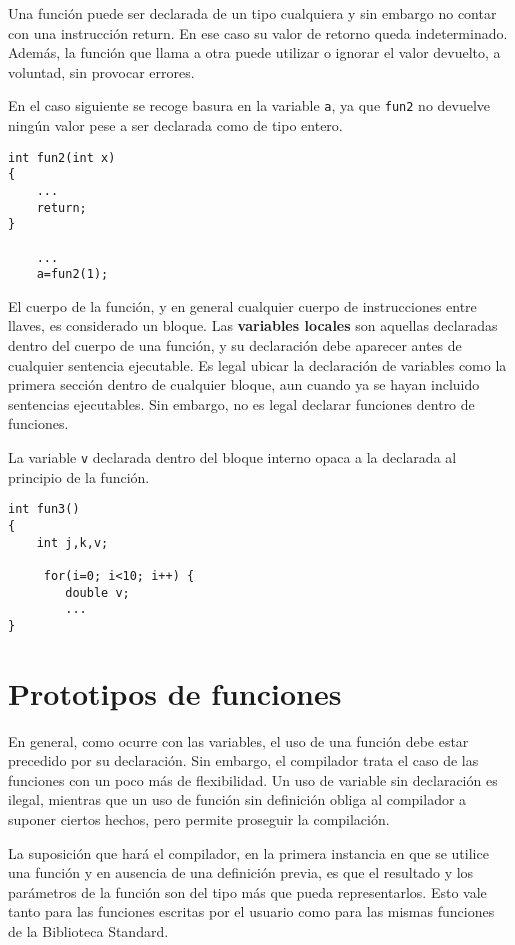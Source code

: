 Una función puede ser declarada de un tipo cualquiera y sin embargo no contar
con una instrucción return. En ese caso su valor de retorno queda
indeterminado. Además, la función que llama a otra puede utilizar o ignorar el
valor devuelto, a voluntad, sin provocar errores.

\begin{ejemplo}
En el caso siguiente se recoge basura en la variable \lstinline{a}, ya que \lstinline{fun2} no devuelve
ningún valor pese a ser declarada como de tipo entero.
\begin{lstlisting}
int fun2(int x)
{
    ...
    return;
}

    ...
    a=fun2(1);
\end{lstlisting}
\end{ejemplo}


El cuerpo de la función, y en general cualquier cuerpo de instrucciones entre
llaves, es considerado un bloque. Las \textbf{variables locales} son aquellas declaradas
dentro del cuerpo de una función, y su declaración debe aparecer antes de
cualquier sentencia ejecutable. Es legal ubicar la declaración de variables
como la primera sección dentro de cualquier bloque, aun cuando ya se hayan
incluido sentencias ejecutables. Sin embargo, no es legal declarar funciones
dentro de funciones. 

\begin{ejemplo}
La variable \lstinline{v} declarada dentro del bloque
interno opaca a la declarada al principio de la función.
\begin{lstlisting}
int fun3()
{
    int j,k,v;

     for(i=0; i<10; i++) {
        double v;
        ...
}
\end{lstlisting}
\end{ejemplo}

	

\section{Prototipos de funciones}
En general, como ocurre con las variables, el uso de una función debe estar
precedido por su declaración. Sin embargo, el compilador trata el caso de las
funciones con un poco más de flexibilidad. Un uso de variable sin declaración
es ilegal, mientras que un uso de función sin definición obliga al compilador a
suponer ciertos hechos, pero permite proseguir la compilación.

La suposición que hará el compilador, en la primera instancia en que se utilice
una función y en ausencia de una definición previa, es que el resultado y los
parámetros de la función son del tipo más  que pueda representarlos.
Esto vale tanto para las funciones escritas por el usuario como para las mismas
funciones de la Biblioteca Standard. 

